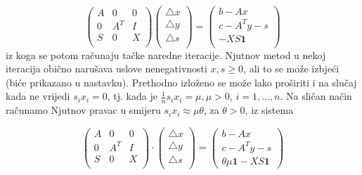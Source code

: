 \documentclass[a4paper, utf8, 11pt, colorlinks]{book}
\begin{document}
\begin{equation}
	\begin{pmatrix}
		A   & 0      &  0      \\
		0   & A^T    &  I      \\
		S   & 0      & X       \\
	\end{pmatrix}  
	\begin{pmatrix} 
		\bigtriangleup  x  \\
		\bigtriangleup  y  \\
		\bigtriangleup  s  \\
	\end{pmatrix} 
	= 
	\begin{pmatrix} 
		b - Ax             \\
		c - A^T y - s      \\
		- X S \textbf{1}  \\                   
	\end{pmatrix} 
\end{equation}
iz koga se potom računaju tačke naredne  iteracije. 
Njutnov metod   u nekoj iteracija obično narušava uslove nenegativnosti $x,s \geq 0$, ali to se može izbjeći (biće prikazano u nastavku).  
Prethodno izloženo se može lako proširiti i na slučaj kada ne vrijedi $s_ix_i = 0$, tj. kada je $\frac{1}{n}s_ix_i = \mu, \mu > 0$, $i=1,\ldots,n$. Na sličan način računamo Njutnov pravac u smijeru $s_i x_i \approx \mu \theta$, za  $\theta >0$, iz sistema 

\begin{equation} \label{eq:newton-interior-system-k}    
	\begin{pmatrix}
		A   & 0      &  0      \\
		0   & A^T    &  I      \\
		S   & 0      & X       \\
	\end{pmatrix} 
	\cdot 
	\begin{pmatrix}
		\bigtriangleup  x  \\
		\bigtriangleup  y  \\
		\bigtriangleup  s  \\
	\end{pmatrix} 
	=
	\begin{pmatrix}
		b - Ax           \\
		c - A^T y - s      \\
		\theta \mu \mathbf{1} - X S \textbf{1}                      
	\end{pmatrix}
\end{equation}
\end{document}
